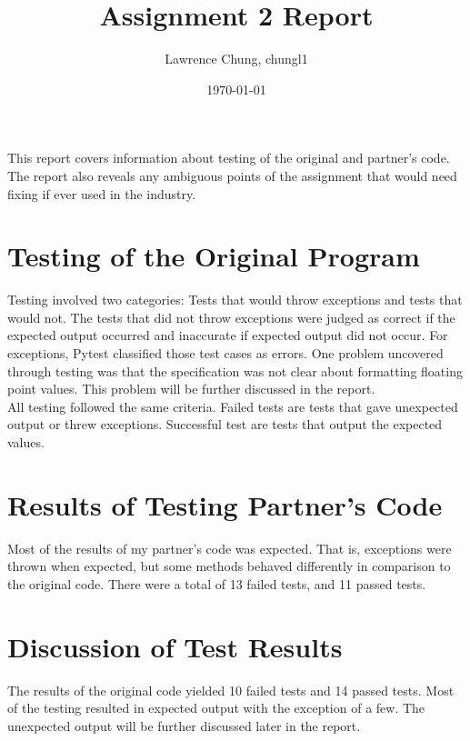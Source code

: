 \documentclass[12pt]{article}
\title{Assignment 2 Report}
\author{Lawrence Chung, chungl1}
\date{\today}
\begin{document}
\maketitle

This report covers information about testing of the original and partner's code. The report 
also reveals any ambiguous points of the assignment that would need fixing if ever used in
the industry.

\section{Testing of the Original Program}

Testing involved two categories: Tests that would throw exceptions and tests that would not.
The tests that did not throw exceptions were judged as correct if the expected output occurred
and inaccurate if expected output did not occur. For exceptions, Pytest classified those test cases
as errors. One problem uncovered through testing was that the specification was not clear about formatting
floating point values. This problem will be further discussed in the report.\\

All testing followed the same criteria. Failed tests are tests that gave unexpected output or threw 
exceptions. Successful test are tests that output the expected values.\\

\section{Results of Testing Partner's Code}

Most of the results of my partner's code was expected. That is, exceptions were thrown when expected, but 
some methods behaved differently in comparison to the original code. There were a total of 13 failed
tests, and 11 passed tests. \\

\section{Discussion of Test Results}

The results of the original code yielded 10 failed tests and 14 passed tests. Most of the testing resulted
in expected output with the exception of a few. The unexpected output will be further discussed later in
the report.\\
\end{document}
